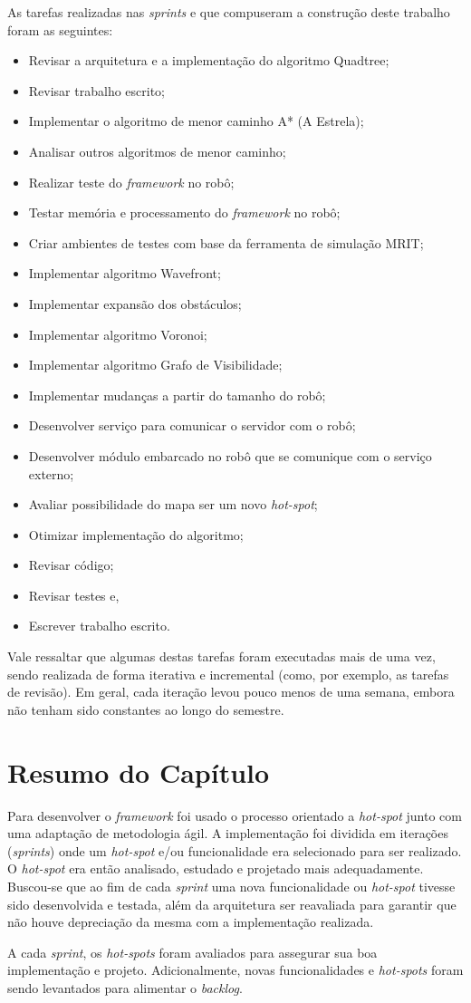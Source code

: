 As tarefas realizadas nas \textit{sprints} e que compuseram a construção deste trabalho foram as seguintes:
\begin{itemize}
  \item Revisar a arquitetura e a implementação do algoritmo Quadtree;
  \item Revisar trabalho escrito;
  \item Implementar o algoritmo de menor caminho A* (A Estrela);
  \item Analisar outros algoritmos de menor caminho;
  \item Realizar teste do \textit{framework} no robô;
  \item Testar memória e processamento do \textit{framework} no robô;
  \item Criar ambientes de testes com base da ferramenta de simulação MRIT;
  \item Implementar algoritmo Wavefront;
  \item Implementar expansão dos obstáculos;
  \item Implementar algoritmo Voronoi;
  \item Implementar algoritmo Grafo de Visibilidade;
  \item Implementar mudanças a partir do tamanho do robô;
  \item Desenvolver serviço para comunicar o servidor com o robô;
  \item Desenvolver módulo embarcado no robô que se comunique com o serviço externo;
  \item Avaliar possibilidade do mapa ser um novo \textit{hot-spot};
  \item Otimizar implementação do algoritmo;
  \item Revisar código;
  \item Revisar testes e,
  \item Escrever trabalho escrito.
\end{itemize}

Vale ressaltar que algumas destas tarefas foram executadas mais de uma vez, sendo realizada de forma iterativa e incremental (como, por exemplo, as tarefas de revisão). Em geral, cada iteração levou pouco menos de uma semana, embora não tenham sido constantes ao longo do semestre.

\section{Resumo do Capítulo}

Para desenvolver o \textit{framework} foi usado o processo orientado a \textit{hot-spot} junto com uma adaptação de metodologia ágil. A implementação foi dividida em iterações (\textit{sprints}) onde um \textit{hot-spot} e/ou funcionalidade era selecionado para ser realizado. O \textit{hot-spot} era então analisado, estudado e projetado mais adequadamente. Buscou-se que ao fim de cada \textit{sprint} uma nova funcionalidade ou \textit{hot-spot} tivesse sido desenvolvida e testada, além da arquitetura ser reavaliada para garantir que não houve depreciação da mesma com a implementação realizada.

A cada \textit{sprint}, os \textit{hot-spots} foram avaliados para assegurar sua boa implementação e projeto. Adicionalmente, novas funcionalidades e \textit{hot-spots} foram sendo levantados para alimentar o \textit{backlog}.